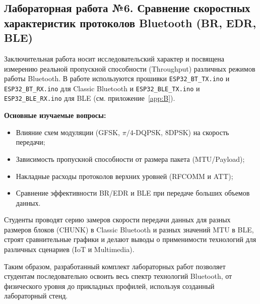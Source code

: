 \subsection{Лабораторная работа №6. Сравнение скоростных характеристик протоколов Bluetooth (BR, EDR, BLE)}
Заключительная работа носит исследовательский характер и посвящена измерению реальной пропускной способности (Throughput) различных режимов работы Bluetooth. В работе используются прошивки \texttt{ESP32\_BT\_TX.ino} и \texttt{ESP32\_BT\_RX.ino} для Classic Bluetooth и \texttt{ESP32\_BLE\_TX.ino} и \texttt{ESP32\_BLE\_RX.ino} для BLE (см. приложение~\ref{app:B}).

\textbf{Основные изучаемые вопросы:}
\begin{itemize}[nosep]
    \item Влияние схем модуляции (GFSK, $\pi/4$-DQPSK, 8DPSK) на скорость передачи;
    \item Зависимость пропускной способности от размера пакета (MTU/Payload);
    \item Накладные расходы протоколов верхних уровней (RFCOMM и ATT);
    \item Сравнение эффективности BR/EDR и BLE при передаче больших объемов данных.
\end{itemize}
Студенты проводят серию замеров скорости передачи данных для разных размеров блоков (CHUNK) в Classic Bluetooth и разных значений MTU в BLE, строят сравнительные графики и делают выводы о применимости технологий для различных сценариев (IoT и Multimedia).

Таким образом, разработанный комплект лабораторных работ позволяет студентам последовательно освоить весь спектр технологий Bluetooth, от физического уровня до прикладных профилей, используя созданный лабораторный стенд.
